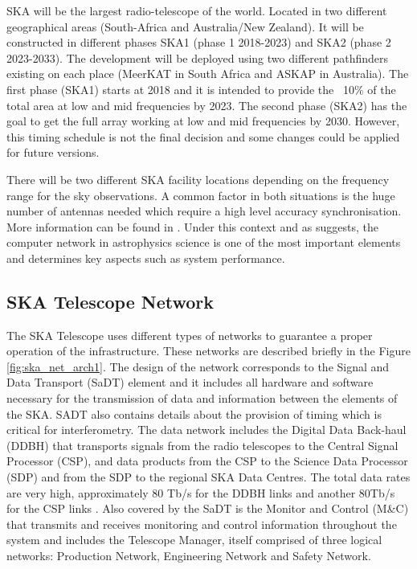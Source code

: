 SKA will be the largest radio-telescope of the 
world. Located in two different geographical areas (South-Africa and 
Australia/New Zealand). It will be 
constructed in different phases SKA1 (phase 1 2018-2023) and SKA2 (phase 2 
2023-2033). The development will be deployed using two different pathfinders 
existing on each place (MeerKAT in South Africa and ASKAP in Australia). 
The first phase (SKA1) starts at 2018 and it is intended to provide the ~10\% 
of the total area at low and 
mid frequencies by 2023. The second phase (SKA2) has the goal to get the full
array working at low and mid frequencies by 2030. However, this timing schedule is
not the final decision and some changes could be applied for future versions.

There will be two different SKA facility locations depending on the frequency 
range for the sky observations. A common factor in both situations is the 
huge number of antennas needed which require a high level accuracy 
synchronisation. More information can be found in  
\cite{ska:baseline_description_v2}. Under this context and as \cite{HUANG201727} suggests, the computer network in astrophysics science is one of the most important elements and determines key aspects such as system performance.

\subsection{SKA Telescope Network} \label{subsec:ska-telescope}

The SKA Telescope uses different types of networks to guarantee a proper operation of the infrastructure. These networks are described briefly in the Figure \ref{fig:ska_net_arch1}. The design of the network corresponds to the Signal and Data Transport (SaDT) element \cite{ska:sadt_website} and it includes all hardware and software necessary for the transmission of data and information between the elements of the SKA. SADT also contains details about the provision of timing which is critical for interferometry.
The data network includes the Digital Data Back-haul (DDBH) that transports signals from the radio telescopes to the Central Signal Processor (CSP), and data products from the CSP to the Science Data Processor (SDP) and from the SDP to the regional SKA Data Centres. The total data rates are very high, approximately 80 Tb/s for the DDBH links and another 80Tb/s for the CSP links \cite{ska:consortia-news}. 
Also covered by the SaDT is the Monitor and Control (M\&C) that transmits and receives monitoring and control information throughout the system and includes the Telescope Manager, itself comprised of three logical networks: Production Network, Engineering Network and Safety Network.

